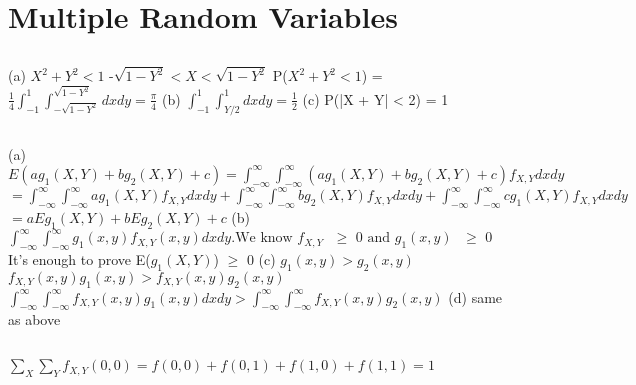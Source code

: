 \documentclass{report}
\begin{document}
	\setcounter{chapter}{3}
	\chapter{Multiple Random Variables}
	
\section{}
(a) $X^2 + Y^2 < 1$
\newline
-$\sqrt{1 - Y^2} < X < \sqrt{1 - Y^2}$
\newline
P($X^2 + Y^2 < 1$) = $\frac{1}{4} \int_{-1}^{1} \int_{-\sqrt{1 - Y^2}}^{\sqrt{1 - Y^2}}dxdy = \frac{\pi}{4}$
\newline
(b) $\int_{-1}^{1} \int_{Y/2}^{1}dxdy = \frac{1}{2}$
\newline
(c) P(|X + Y| < 2) = 1
\newline

\section{}
(a) $E(ag_1(X, Y) + bg_2(X, Y) + c) = \int_{-\infty}^{\infty}\int_{-\infty}^{\infty}(ag_1(X, Y) + bg_2(X, Y) + c)f_{X,Y}dxdy$ \newline
$ = \int_{-\infty}^{\infty}\int_{-\infty}^{\infty}ag_1(X, Y)f_{X, Y}dxdy + \int_{-\infty}^{\infty}\int_{-\infty}^{\infty}bg_2(X, Y)f_{X, Y}dxdy + \int_{-\infty}^{\infty}\int_{-\infty}^{\infty}cg_1(X, Y)f_{X, Y}dxdy$ \newline
$= aEg_1(X, Y) + bEg_2(X, Y) + c$
\newline
(b) $\int_{-\infty}^{\infty}\int_{-\infty}^{\infty}g_1(x, y)f_{X, Y}(x, y)dxdy. \text{We know $f_{X, Y}$ $\ge$ 0 and $g_1(x, y)$ $\ge$ 0}$
\newline
It's enough to prove E($g_1(X, Y)$) $\ge$ 0
\newline
(c) $g_1(x, y) > g_2(x, y)$
\newline
$f_{X, Y}(x, y)g_1(x, y) > f_{X, Y}(x, y)g_2(x, y)$
\newline
$\int_{-\infty}^{\infty}\int_{-\infty}^{\infty}f_{X, Y}(x, y)g_1(x, y)dxdy > \int_{-\infty}^{\infty}\int_{-\infty}^{\infty}f_{X, Y}(x, y)g_2(x, y)$
\newline
(d) same as above
\newline

\section{}
$\sum_{X}\sum_{Y}f_{X, Y}(0, 0) = f(0, 0) + f(0, 1) + f(1, 0) + f(1, 1) = 1$
\newline
\end{document}
